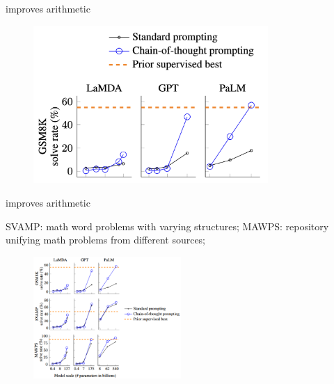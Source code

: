 \begin{vbframe}{\cotp improves arithmetic}

\vfill
	
	\begin{figure}
		\centering
		\includegraphics[height = 6cm]{figure/cotperformance} 
	\end{figure}

\vfill

\end{vbframe}


\begin{vbframe}{\cotp improves arithmetic}


SVAMP: math word problems with varying structures; MAWPS:
repository unifying math problems from different sources;

\begin{figure}
    \centering
    \includegraphics[width=0.5\textwidth]{figure/cot_performance1.png}
\end{figure}


\end{vbframe}


